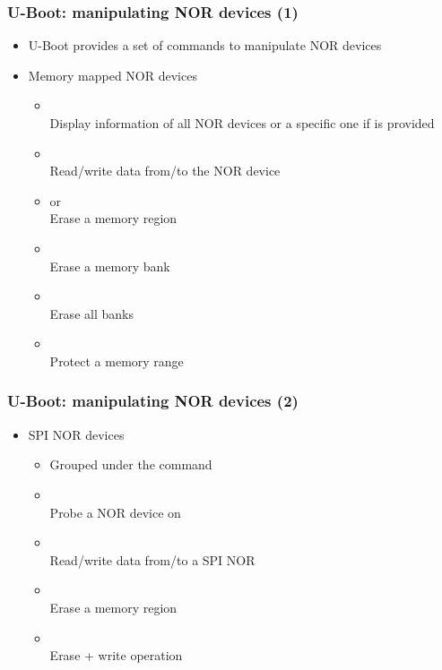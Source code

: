 \begin{frame}
  \frametitle{U-Boot: manipulating NOR devices (1)}
  \begin{itemize}
  \item U-Boot provides a set of commands to manipulate NOR devices
  \item Memory mapped NOR devices
    \begin{itemize}
    \item {}\\
      Display information of all NOR devices
      or a specific one if  is provided
    \item {}\\
      Read/write data from/to the NOR device
    \item {} or \\
      Erase a memory region
    \item {}\\
      Erase a memory bank
    \item {}\\
      Erase all banks
    \item {}\\
      Protect a memory range
    \end{itemize}
  \end{itemize}
\end{frame}

\begin{frame}
  \frametitle{U-Boot: manipulating NOR devices (2)}
  \begin{itemize}
  \item SPI NOR devices
    \begin{itemize}
    \item Grouped under the  command
    \item {}\\
       Probe a NOR device on
    \item {}\\
       Read/write data from/to a SPI NOR
    \item {}\\
       Erase a memory region
    \item {}\\
       Erase + write operation
    \end{itemize}
  \end{itemize}
\end{frame}

